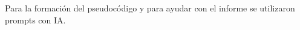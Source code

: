 \begin{mdframed}
    Para la formación del pseudocódigo y para ayudar con el informe se utilizaron prompts con IA.
\end{mdframed}